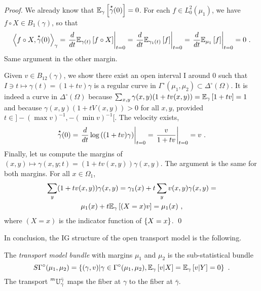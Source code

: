 \documentclass[runningheads]{llncs}
\begin{document}
\begin{proof}
We already know that ${\operatorname{\mathbb E}}_{\gamma}\left[\overset{\star}{\gamma}(0)\right] = 0$. For each $f \in L^2_0(\mu_1)$, we have $f \circ X \in B_1(\gamma)$, so that 
%
    \begin{equation*}
    \left\langle f \circ X , \overset{\star}{\gamma}(0) \right\rangle_{\gamma} = \left. \frac{d}{dt} {\operatorname{\mathbb E}}_{\gamma(t)}\left[f \circ X\right] \right|_{t=0} = \left. \frac{d}{dt} {\operatorname{\mathbb E}}_{\gamma_1(t)}\left[f\right] \right|_{t=0} = \left. \frac{d}{dt} {\operatorname{\mathbb E}}_{\mu_1}\left[f\right] \right|_{t=0} = 0 \ .
    \end{equation*}
%
    Same argument in the other margin.
    
Given $v \in B_{12}(\gamma)$, we show there exist an open interval I around 0 such that $I \ni t \mapsto \gamma(t) = (1+tv)\gamma$ is a regular curve in $\Gamma^\circ(\mu_1,\mu_2) \subset \Delta^\circ(\Omega)$. It is indeed a curve in $\Delta^\circ(\Omega)$ because $\sum_{x,y} \gamma(x,y)(1+tv(x,y)) = {\operatorname{\mathbb E}}_{\gamma}\left[1+tv\right] = 1$ and because $\gamma(x,y)(1+tV(x,y)) > 0$ for all $x,y$, provided $t \in ]- (\max v)^{-1}, - (\min v)^{-1}[$.  The velocity exists,
%
\    \begin{equation*}
     \overset{\star}{\gamma}(0) = \left.  \frac{d}{dt} \log\left( (1+tv)\gamma \right) \right|_{t=0} = \left. \frac v {1+tv} \right|_{t=0} = v \ .
    \end{equation*}
%
Finally, let us compute the margins of $(x,y) \mapsto \gamma(x,y;t) = (1+tv(x,y))\gamma(x,y)$. The argument is the same for both margins. For all $x \in \Omega_1$,
%
\begin{multline*}
  \sum_y (1+tv(x,y))\gamma(x,y) = \gamma_1(x) + t \sum_y v(x,y)\gamma(x,y) = \\ \mu_1(x) + t {\operatorname{\mathbb E}}_{\gamma}\left[(X = x) v\right] = \mu_1(x) \ ,
\end{multline*}
%
where $(X = x)$ is the indicator function of $\left\{ X = x \right\}$. \qed
\end{proof}
 
In conclusion, the IG structure of the open transport model is the following.

\begin{proposition} The \emph{transport model bundle} with margins $\mu_1$ and $\mu_2$ is the sub-statistical bundle
%
\begin{equation} \label{eq:2}
  S\Gamma^\circ(\mu_1,\mu_2) = \left\{ (\gamma,v) \middle| \gamma\in\Gamma^\circ(\mu_1,\mu_2), {\operatorname{\mathbb E}}_{\gamma}\left[v \middle| X\right] = {\operatorname{\mathbb E}}_{\gamma}\left[v \middle| Y\right] = 0 \right\} \ .
\end{equation}
The transport $\prescript{m}{}{\mathbb U}_{\gamma}^{\bar\gamma}$ maps the fiber at $\gamma$ to the fiber at $\bar\gamma$.
\end{proposition}
\end{document}
